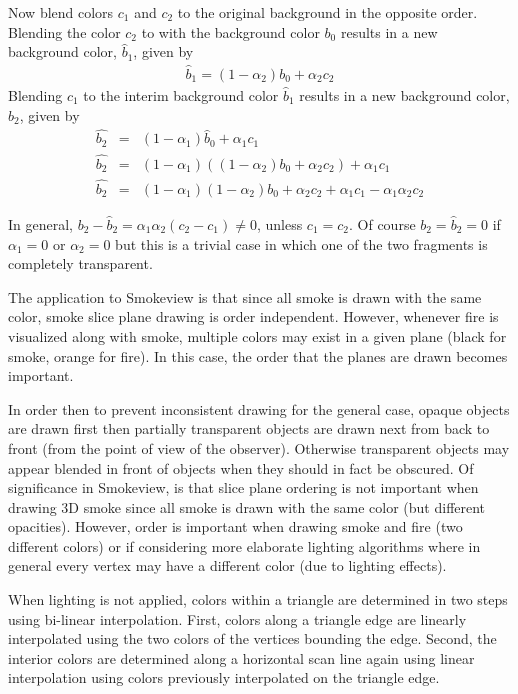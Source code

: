 \documentclass[11pt,twoside]{book}
\begin{document}
Now blend colors $c_1$ and $c_2$ to the original background in the opposite order.
Blending the color $c_2$ to with the background color $b_0$ results in a new background color, $\hat{b}_1$, given by
\begin{eqnarray}
\hat{b}_1=(1-\alpha_2)b_0 + \alpha_2c_2
\end{eqnarray}
Blending $c_1$ to the interim background color $\hat{b}_1$ results in a new background color, $\hat{b}_2$, given by
\begin{eqnarray}
\hat{b_2}&=&(1-\alpha_1)\hat{b}_0+\alpha_1c_1\\
\hat{b_2}&=&(1-\alpha_1)((1-\alpha_2)b_0 + \alpha_2c_2)+\alpha_1c_1\\
\hat{b_2}&=&(1-\alpha_1)(1-\alpha_2)b_0 + \alpha_2c_2 + \alpha_1c_1 - \alpha_1\alpha_2c_2
\end{eqnarray}


In general, $b_2-\hat{b}_2=\alpha_1\alpha_2(c_2-c_1)\ne 0$, unless $c_1=c_2$.  Of course $b_2=\hat{b}_2=0$ if $\alpha_1=0$ or $\alpha_2=0$ but this is a trivial case in which one of the two fragments is completely transparent.

The application to Smokeview is that since all smoke is drawn with the same color, smoke slice plane drawing is order independent.  However, whenever fire is visualized along with smoke, multiple colors may exist in a given plane (black for smoke, orange for fire).  In this case, the order that the planes are drawn becomes important.

In order then to prevent inconsistent drawing for the general
case, opaque objects are drawn first then partially transparent
objects are drawn next from back to front (from the point of view
of the observer). Otherwise transparent objects may appear blended
in front of objects when they should in fact be obscured. Of
significance in Smokeview, is that slice plane ordering is not
important when drawing 3D smoke since all smoke is drawn with the
same color (but different opacities).  However, order is important
when drawing smoke and fire (two different colors) or if
considering more elaborate lighting algorithms where in general
every vertex may have a different color (due to lighting effects).

When lighting is not applied, colors within a triangle are
determined in two steps using bi-linear interpolation. First,
colors along a triangle edge are linearly interpolated using the
two colors of the vertices bounding the edge. Second, the interior
colors are determined along a horizontal scan line again using
linear interpolation using colors previously interpolated on the
triangle edge.
\end{document}
